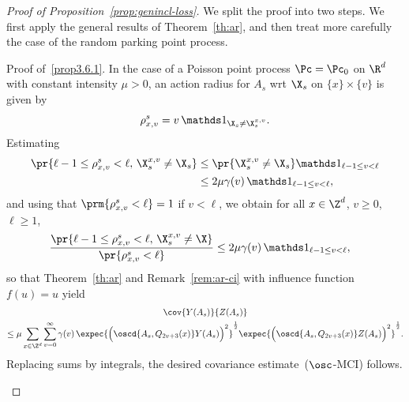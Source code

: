 \begin{proof}[Proof of Proposition~\ref{prop:genincl-loss}]
We split the proof into two steps. We first apply the general results of Theorem~\ref{th:ar}, and then treat more carefully the case of the random parking point process.


\setcounter{stepcount}{0}
\begin{step}{Proof of~\eqref{prop3.6.1}.}\label{step1proofprop3.6}
In the case of a Poisson point process $\Pc=\Pc_0$ on $\R^d$ with constant intensity $\mu>0$, an action radius for $A_s$ wrt $\X_s$ on $\{x\}\times\{v\}$ is given by
\[
\rho_{x,v}^s=v\,\mathds1_{\X_s\ne \X_s^{x,v}}.
\]
Estimating
\begin{align*}
\pr{\ell-1\le\rho^s_{x,v}< \ell,\,\X_s^{x,v}\ne \X_s} &\le \pr{\X_s^{x,v}\ne \X_s}\mathds1_{\ell-1\le v<\ell}\\
&\le2\mu\gamma(v)\,\mathds1_{\ell-1\le v<\ell},
\end{align*}
and using that $\prm{\rho^s_{x,v}< \ell}=1$ if $v<\ell$, we obtain for all $x\in\Z^d$, $v\ge0$, $\ell\ge1$,
\begin{align*}
\frac{\pr{\ell-1\le \rho^s_{x,v}< \ell,\,\X_s^{x,v}\ne \X}}{\pr{\rho^s_{x,v}< \ell}}&\le 2\mu\gamma(v)\,\mathds1_{\ell-1\le v< \ell},
\end{align*}
so that Theorem~\ref{th:ar} and Remark~\ref{rem:ar-ci} with influence function $f(u)=u$ yield
\begin{multline*}
\cov{Y(A_s)}{Z(A_s)}\\
\le\mu\sum_{x\in\Z^d}\sum_{v=0}^\infty\gamma(v)\,\expec{\Big(\oscd{A_s,Q_{2v+3}(x)}Y(A_s)\Big)^2}^\frac12\expec{\Big(\oscd{A_s,Q_{2v+3}(x)}Z(A_s)\Big)^2}^\frac12.
\end{multline*}
Replacing sums by integrals, the desired covariance estimate~($\osc$-MCI) follows.
\end{step}

\medskip


\end{proof}
